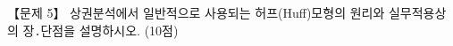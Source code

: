 \begin{longquestion}{【문제 5】}
상권분석에서 일반적으로 사용되는 허프(Huff)모형의 원리와 실무적용상의 장․단점을 설명하시오. (10점) \par
\end{longquestion}
